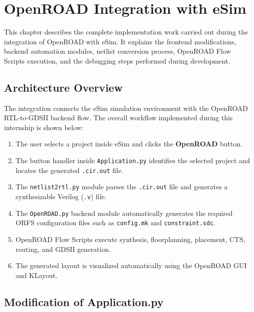 \chapter{OpenROAD Integration with eSim}

This chapter describes the complete implementation work carried out during the integration of OpenROAD with eSim. It explains the frontend modifications, backend automation modules, netlist conversion process, OpenROAD Flow Scripts execution, and the debugging steps performed during development.

\section{Architecture Overview}

The integration connects the eSim simulation environment with the OpenROAD RTL-to-GDSII backend flow. The overall workflow implemented during this internship is shown below:

\begin{enumerate}
    \item The user selects a project inside eSim and clicks the \textbf{OpenROAD} button.
    
    \item The button handler inside \texttt{Application.py} identifies the selected project and locates the generated \texttt{.cir.out} file.
    
    \item The \texttt{netlist2rtl.py} module parses the \texttt{.cir.out} file and generates a synthesizable Verilog (\texttt{.v}) file.
    
    \item The \texttt{OpenROAD.py} backend module automatically generates the required ORFS configuration files such as \texttt{config.mk} and \texttt{constraint.sdc}.
    
    \item OpenROAD Flow Scripts execute synthesis, floorplanning, placement, CTS, routing, and GDSII generation.
    
    \item The generated layout is visualized automatically using the OpenROAD GUI and KLayout.
\end{enumerate}

\section{Modification of Application.py}

